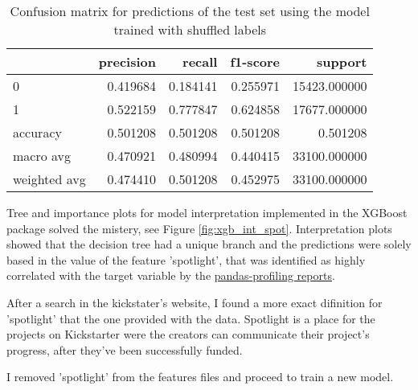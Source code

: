 \documentclass{article}
\begin{document}
\begin{itemize}
\begin{table}[h!]
\centering
\begin{tabular}{lrrrr}
\toprule
{} &  precision &    recall &  f1-score &       support \\
\midrule
0            &   0.419684 &  0.184141 &  0.255971 &  15423.000000 \\
1            &   0.522159 &  0.777847 &  0.624858 &  17677.000000 \\
accuracy     &   0.501208 &  0.501208 &  0.501208 &      0.501208 \\
macro avg    &   0.470921 &  0.480994 &  0.440415 &  33100.000000 \\
weighted avg &   0.474410 &  0.501208 &  0.452975 &  33100.000000 \\
\bottomrule
\end{tabular}
\caption{Confusion matrix for predictions of the test set using the model trained with shuffled labels}
\label{table:model1_te_sh_cm}
\end{table}

Tree and importance plots for model interpretation implemented in the XGBoost package solved the mistery, see Figure \ref{fig:xgb_int_spot}. Interpretation plots showed that the decision tree had a unique branch and the predictions were solely based in the value of the feature 'spotlight', that was identified as highly correlated with the target variable by the \href{http://gloriagcurto.info/EDA_profiles}{pandas-profiling reports}.

After a search in the kickstater's website, I found a more exact difinition for 'spotlight' that the one provided with the data. Spotlight is a place for the projects on Kickstarter were the creators can communicate their project's progress, after they’ve been successfully funded.

I removed 'spotlight' from the features files and proceed to train a new model.


\end{itemize}
\end{document}
